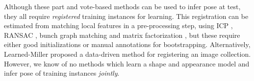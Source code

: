 Although these part and vote-based methods can be used to infer pose at test, they all require \emph{registered} training instances for learning. 
This registration can be estimated from matching local features in a pre-processing step, using ICP \cite{Pham2011}, RANSAC \cite{Moreels2007}, bunch graph matching \cite{Wiskott1997} and matrix factorization \cite{Arie-Nachimson2009}, but these require either good initializations or manual annotations for bootstrapping. Alternatively, Learned-Miller \cite{Learned-Miller2006} proposed a data-driven method for registering an image collection. However, we know of no methods which learn a shape and appearance model and infer pose of training instances \emph{jointly}.





